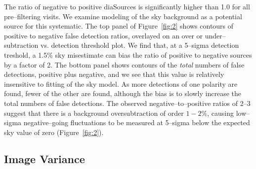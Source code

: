 \documentclass[iop]{emulateapj}
\begin{document}
The ratio of negative to positive diaSources is significantly higher than 1.0 for all pre--filtering visits.
We examine modeling of the sky background as a potential source for this systematic.
The top panel of Figure~\ref{fig:2} shows contours of positive to negative false detection ratios, overlayed on an over or under--subtraction vs. detection threshold plot.
We find that, at a 5--sigma detection treshold, a 1.5\% sky misestimate can bias the ratio of positive to negative sources by a factor of 2.
The bottom panel shows contours of the {\it total} numbers of false detections, positive plus negative, and we see that this value is relatively insensitive to fitting of the sky model.
As more detections of one polarity are found, fewer of the other are found, although the bias is to slowly increase the total numbers of false detections.
The observed negative--to--positive ratios of 2--3 suggest that there is a background oversubtraction of order $1-2\%$, causing low--sigma negative--going fluctuations to be measured at 5--sigma below the expected sky value of zero (Figure~\ref{fig:2}).
\begin{figure*}[!ht]
\centering
{}
\caption{
Misestimation of the sky background value has an effect on both the number of false detections, and relative abundance of positive to negative false detections.
The top pane of this figure shows the multiplicative change in relative number of +ve/-ve (-ve/+ve) detections if the sky background is under (over) subtracted, as a function of detection threshold.
The bottom panel shows how the total number of false detections changes for the same misestimation.
This is not a strong function of the seeing; these numbers are appropriate for the 0.6'' simulation presented here.
}
\label{fig:2}
\end{figure*}

\subsection{Image Variance \label{sec-varmis}}
\end{document}
